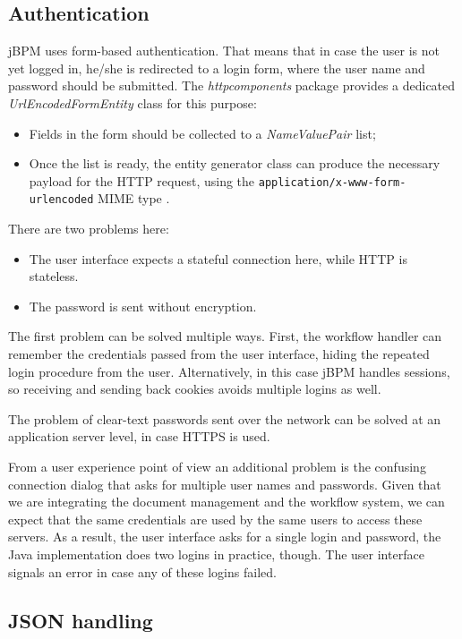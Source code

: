 \subsection{Authentication}

jBPM uses form-based authentication. That means that in case the user is not
yet logged in, he/she is redirected to a login form, where the user name and
password should be submitted. The \emph{httpcomponents} package provides a
dedicated \emph{UrlEncodedFormEntity} class for this purpose:

\begin{itemize}
\item Fields in the form should be collected to a \emph{NameValuePair} list;
\item Once the list is ready, the entity generator class can produce the
necessary payload for the HTTP request, using the
\texttt{application/x-www-form-urlencoded} MIME type \cite{form-encoding}.
\end{itemize}

There are two problems here:

\begin{itemize}
\item The user interface expects a stateful connection here, while HTTP is stateless.
\item The password is sent without encryption.
\end{itemize}

The first problem can be solved multiple ways. First, the workflow handler can
remember the credentials passed from the user interface, hiding the repeated
login procedure from the user. Alternatively, in this case jBPM handles
sessions, so receiving and sending back cookies avoids multiple logins as well.

The problem of clear-text passwords sent over the network can be solved at an
application server level, in case HTTPS is used.

From a user experience point of view an additional problem is the confusing
connection dialog that asks for multiple user names and passwords. Given that
we are integrating the document management and the workflow system, we can
expect that the same credentials are used by the same users to access these
servers. As a result, the user interface asks for a single login and password,
the Java implementation does two logins in practice, though. The user interface
signals an error in case any of these logins failed.

\subsection{JSON handling}

